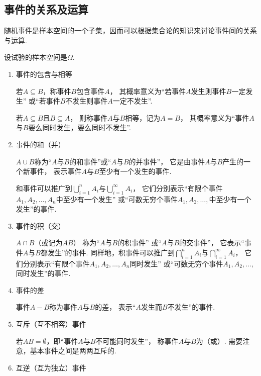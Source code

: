 \subsection{事件的关系及运算}
随机事件是样本空间的一个子集，因而可以根据集合论的知识来讨论事件间的关系与运算.

\begin{definition}
设试验的样本空间是\(\Omega\).

\begin{enumerate}
\item 事件的包含与相等

若\(A \subseteq B\)，称事件\(B\)包含事件\(A\)，
其概率意义为“若事件\(A\)发生则事件\(B\)一定发生”
或“若事件\(B\)不发生则事件\(A\)一定不发生”.

若\(A \subseteq B\)且\(B \subseteq A\)，
则称事件\(A\)与\(B\)相等，记为\(A = B\)，
其概率意义为“事件\(A\)与\(B\)要么同时发生，要么同时不发生”.

\item 事件的和（并）

\(A \cup B\)称为“\(A\)与\(B\)的和事件”或“\(A\)与\(B\)的并事件”，
它是由事件\(A\)与\(B\)产生的一个新事件，
表示事件\(A\)与\(B\)至少有一个发生的事件.

和事件可以推广到\(\bigcup\limits_{i=1}^n A_i\)与\(\bigcup\limits_{i=1}^\infty A_i\)，
它们分别表示“有限个事件\(A_1,A_2,\dotsc,A_n\)中至少有一个发生”
或“可数无穷个事件\(A_1,A_2,\dotsc,\)中至少有一个发生”的事件.

\item 事件的积（交）

\(A \cap B\)（或记为\(AB\)）
称为“\(A\)与\(B\)的积事件”
或“\(A\)与\(B\)的交事件”，
它表示“事件\(A\)与\(B\)都发生”的事件.
同样地，积事件可以推广到\(\bigcap\limits_{i=1}^n A_i\)与\(\bigcap\limits_{i=1}^\infty A_i\)，
它们分别表示“有限个事件\(A_1,A_2,\dotsc,A_n\)同时发生”
或“可数无穷个事件\(A_1,A_2,\dotsc,\)同时发生”的事件.

\item 事件的差

事件\(A-B\)称为事件\(A\)与\(B\)的差，
表示“\(A\)发生而\(B\)不发生”的事件.

\item 互斥（互不相容）事件

若\(AB = \emptyset\)，即“事件\(A\)与\(B\)不可能同时发生”，
称事件\(A\)与\(B\)为（或）.
需要注意，基本事件之间是两两互斥的.

\item 互逆（互为独立）事件


\end{enumerate}
\end{definition}
